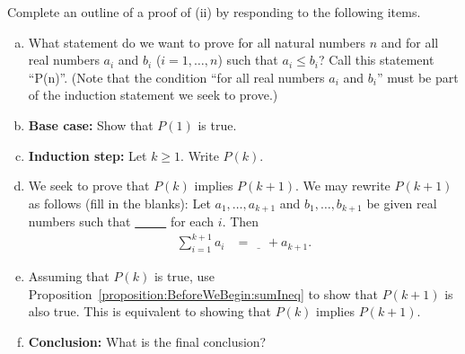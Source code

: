 \begin{exercise}{}
Complete an outline of a proof of (ii) by responding to the following items.
\begin{enumerate}[(a)]
\item
What statement do we want to prove  for all natural numbers $n$ and for all real numbers $a_i$ and $b_i$ ($i=1,\dots,n$)
such that $a_i\le b_i$? Call this statement ``P(n)''.
(Note that the condition ``for all real numbers $a_i$ and $b_i$''
must be part of the induction statement we seek to prove.)
\item
\textbf{Base case:} Show that $P(1)$ is true.
\item
\textbf{Induction step:}  Let $k\ge 1$. Write $P(k)$.
\item
We seek to prove that $P(k)$ implies $P(k+1)$.  We may rewrite $P(k+1)$ as follows (fill in the blanks):
Let $a_1,\dots,a_{k+1}$ and $b_1,\dots,b_{k+1}$ be given real numbers
such that \underline{~~~~~} for each $i$.
Then
\begin{align*}
\sum_{i=1}^{k+1}a_i
&=\underline{~~~~~} + a_{k+1}.
\end{align*}
\item
Assuming that $P(k)$ is true, use  Proposition~\ref{proposition:BeforeWeBegin:sumIneq} to show that $P(k+1)$ is also true.  This is equivalent to showing that $P(k)$ implies $P(k+1)$.
\item 
\textbf{Conclusion:} What is the final conclusion?
\end{enumerate}
\end{exercise}


